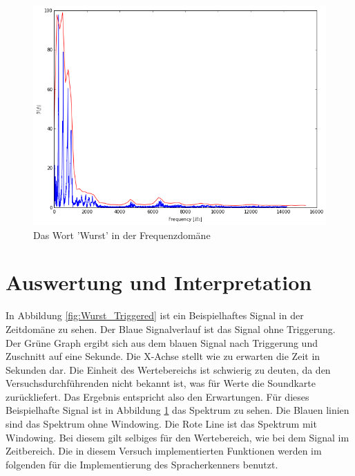 \begin{figure}[H]
\label{fig:Wurst_Fourier}
\includegraphics[width=\textwidth]{media/Wurst_vgl.png}
\caption{Das Wort 'Wurst' in der Frequenzdomäne}
\end{figure}


\section{Auswertung und Interpretation}
\label{chap:VERSUCH_1_AUSWERTUNG}
In Abbildung \ref{fig:Wurst_Triggered} ist ein Beispielhaftes Signal in der Zeitdomäne zu sehen. Der Blaue Signalverlauf ist das Signal ohne Triggerung. Der Grüne Graph ergibt sich aus dem blauen Signal nach Triggerung und Zuschnitt auf eine Sekunde. Die X-Achse stellt wie zu erwarten die Zeit in Sekunden dar. Die Einheit des Wertebereichs ist schwierig zu deuten, da den Versuchsdurchführenden nicht bekannt ist, was für Werte die Soundkarte zurückliefert. Das Ergebnis entspricht also den Erwartungen. Für dieses Beispielhafte Signal ist in Abbildung \ref{fig:Wurst_Fourier} das Spektrum zu sehen. Die Blauen linien sind das Spektrum ohne Windowing. Die Rote Line ist das Spektrum mit Windowing.
Bei diesem gilt selbiges für den Wertebereich, wie bei dem Signal im Zeitbereich. 
Die in diesem Versuch implementierten Funktionen werden im folgenden für die Implementierung des Spracherkenners benutzt.
